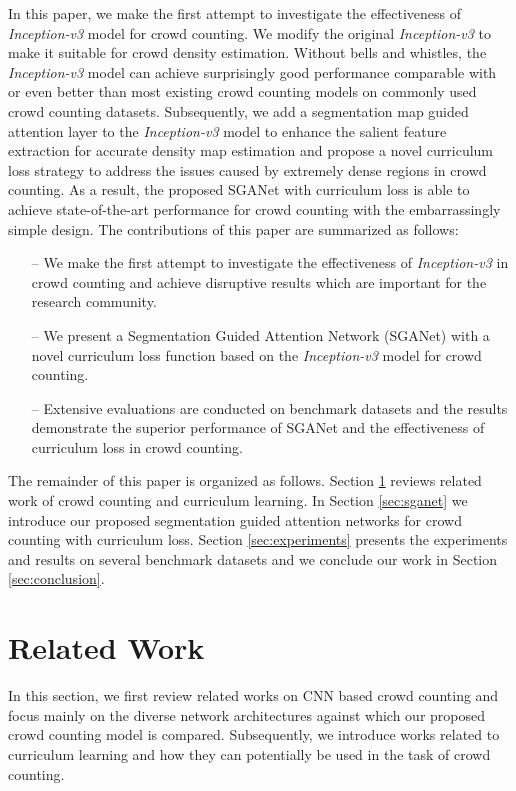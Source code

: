 \documentclass[journal,comsoc]{IEEEtran}
\begin{document}
In this paper, we make the first attempt to investigate the effectiveness of \textit{Inception-v3} model for crowd counting. We modify the original \textit{Inception-v3} to make it suitable for crowd density estimation. Without bells and whistles, the \textit{Inception-v3} model can achieve surprisingly good performance comparable with or even better than most existing crowd counting models on commonly used crowd counting datasets. Subsequently, we add a segmentation map guided attention layer to the \textit{Inception-v3} model to enhance the salient feature extraction for accurate density map estimation and propose a novel curriculum loss strategy to address the issues caused by extremely dense regions in crowd counting. As a result, the proposed SGANet with curriculum loss is able to achieve state-of-the-art performance for crowd counting with the embarrassingly simple design.
The contributions of this paper are summarized as follows:
\begin{itemize}
    \item [--] We make the first attempt to investigate the effectiveness of \textit{Inception-v3} in crowd counting and achieve disruptive results which are important for the research community.
    \item [--] We present a Segmentation Guided Attention Network (SGANet) with a novel curriculum loss function based on the \textit{Inception-v3} model for crowd counting.
    \item [--] Extensive evaluations are conducted on benchmark datasets and the results demonstrate the superior performance of SGANet and the effectiveness of curriculum loss in crowd counting.
\end{itemize}

The remainder of this paper is organized as follows.
Section \ref{sec:related} reviews related work of crowd counting and curriculum learning. In Section \ref{sec:sganet} we introduce our proposed segmentation guided attention networks for crowd counting with curriculum loss. Section \ref{sec:experiments} presents the experiments and results on several benchmark datasets and we conclude our work in Section \ref{sec:conclusion}.









\section{Related Work}\label{sec:related}
In this section, we first review related works on CNN based crowd counting and focus mainly on the diverse network architectures against which our proposed crowd counting model is compared. Subsequently, we introduce works related to curriculum learning and how they can potentially be used in the task of crowd counting.
\end{document}
